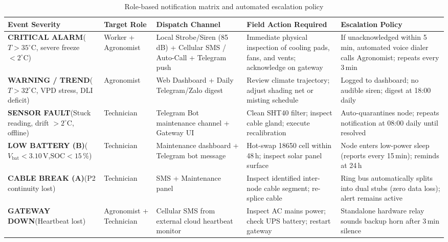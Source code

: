 \documentclass[11pt,a4paper]{report}
\begin{document}
\begin{table}[htbp]
\centering
\caption{Role-based notification matrix and automated escalation policy}\label{tab:notify}
\small
\begin{tabularx}{\textwidth}{>{\raggedright\arraybackslash}p{2.6cm} >{\raggedright\arraybackslash}p{1.8cm} >{\raggedright\arraybackslash}p{3.0cm} >{\raggedright\arraybackslash}p{3.4cm} Y}
\toprule
\textbf{Event Severity} & \textbf{Target Role} & \textbf{Dispatch Channel} & \textbf{Field Action Required} & \textbf{Escalation Policy}\\
\midrule
\textbf{CRITICAL ALARM}\newline ($T > 35^\circ\text{C}$, severe freeze $< 2^\circ\text{C}$) & Worker \newline+ Agronomist & Local Strobe/Siren (85\,dB) \newline+ Cellular SMS / Auto-Call \newline+ Telegram push & Immediate physical inspection of cooling pads, fans, and vents; acknowledge on gateway & If unacknowledged within 5\,min, automated voice dialer calls Agronomist; repeats every 3\,min\\
\midrule
\textbf{WARNING / TREND}\newline ($T > 32^\circ\text{C}$, VPD stress, DLI deficit) & Agronomist & Web Dashboard \newline+ Daily Telegram/Zalo digest & Review climate trajectory; adjust shading net or misting schedule & Logged to dashboard; no audible siren; digest at 18:00 daily\\
\midrule
\textbf{SENSOR FAULT}\newline (Stuck reading, drift $> 2^\circ\text{C}$, offline) & Technician & Telegram Bot maintenance channel + Gateway UI & Clean SHT40 filter; inspect cable gland; execute recalibration & Auto-quarantines node; repeats notification at 08:00 daily until resolved\\
\midrule
\textbf{LOW BATTERY (B)}\newline ($V_{\text{bat}} < 3.10\,\text{V}$,\newline $\text{SOC} < 15\,\%$) & Technician & Maintenance dashboard \newline+ Telegram bot message & Hot-swap 18650 cell within 48\,h; inspect solar panel surface & Node enters low-power sleep (reports every 15\,min); reminds at 24\,h\\
\midrule
\textbf{CABLE BREAK (A)}\newline (P2 continuity lost) & Technician & SMS + Maintenance panel & Inspect identified inter-node cable segment; re-splice cable & Ring bus automatically splits into dual stubs (zero data loss); alert remains active\\
\midrule
\textbf{GATEWAY DOWN}\newline (Heartbeat lost) & Agronomist \newline+ Technician & Cellular SMS from external cloud heartbeat monitor & Inspect AC mains power; check UPS battery; restart gateway & Standalone hardware relay sounds backup horn after 3\,min silence\\
\bottomrule
\end{tabularx}
\end{table}
\end{document}
